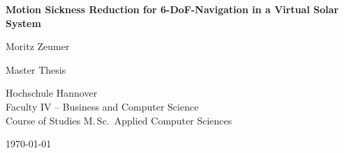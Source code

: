 \documentclass[11pt,DIV=12,BCOR=0mm,twoside,openright,headings=normal,%
  numbers=noenddot,headsepline,headinclude]{scrreprt}
\begin{document}
    \newlength{\HsHOffset}
    \setlength{\HsHOffset}{0.05\paperheight}

    \begin{center}
        \vspace*{4\baselineskip}
        {\sffamily\bfseries\LARGE
        Motion Sickness Reduction for 6-DoF-Navigation in a Virtual Solar System\par}

        \vspace*{4\baselineskip}
        {\Large Moritz Zeumer}

        \vfill
        {\Large Master Thesis}

        \vspace*{4\baselineskip}
        {\Large Hochschule Hannover\\
        Faculty IV -- Business and Computer Science\\
        Course of Studies M.\,Sc.\ Applied Computer Sciences\par}

        \vspace*{4\baselineskip}
        {\Large \today}

        \vspace*{4\baselineskip}
    \end{center}
\end{document}
